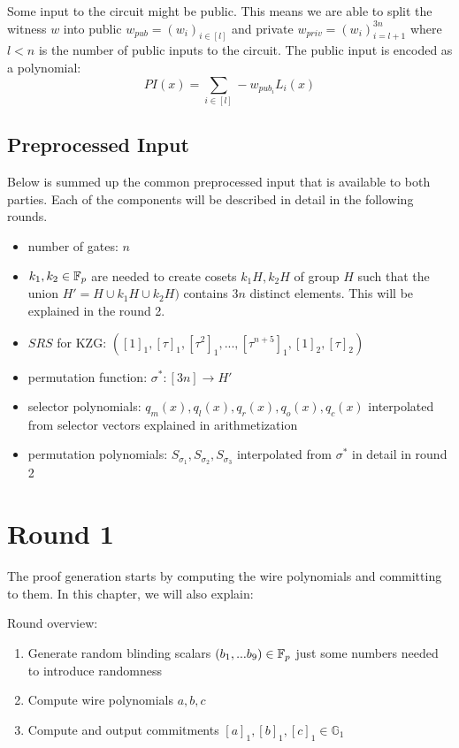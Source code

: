 Some input to the circuit might be public. This means we are able to split the witness $w$ into public $w_{pub} = (w_i)_{i\in [l]}$ and private $w_{priv} = (w_i)_{i = l+1}^{3n}$ where $l < n$ is the number of public inputs to the circuit. The public input is encoded as a polynomial:
$$PI(x) = \sum_{i \in [l]} - w_{pub_i} L_i(x)$$


\subsection{Preprocessed Input}
Below is summed up the common preprocessed input that is available to both parties. Each of the components will be described in detail in the following rounds.

\begin{itemize}
    \item number of gates: $n$
    \item $k_1, k_2 \in \mathbb{F}_p$ are needed to create cosets $k_1 H , k_2 H$ of group $H$ such that the union $H' = H \cup k_1 H \cup k_2H)$ contains $3n$ distinct elements. This will be explained in the round 2.
    \item $SRS$ for KZG: $([1]_1, [\tau]_1, [\tau^2]_1, ..., [\tau^{n+5}]_1, [1]_2, [\tau]_2)$ 
    \item permutation function: $\sigma^*: [3n] \rightarrow H'$ 
    \item selector polynomials: $q_m(x), q_l(x), q_r(x), q_o(x), q_c(x)$ interpolated from selector vectors explained in arithmetization
    \item permutation polynomials: $S_{\sigma_1}, S_{\sigma_2}, S_{\sigma_3}$ interpolated from $\sigma^*$ in detail in round 2
\end{itemize}


\section{Round 1}
\label{chap:round1}

The proof generation starts by computing the wire polynomials and committing to them. In this chapter, we will also explain:

Round overview:
\begin{enumerate}
    \item Generate random blinding scalars $(b_1, ... b_9) \in \mathbb{F}_p$ just some numbers needed to introduce randomness 
    \item Compute wire polynomials $a, b, c$
    \item Compute and output commitments $[a]_1, [b]_1, [c]_1 \in \mathbb{G}_1$ 
\end{enumerate}

